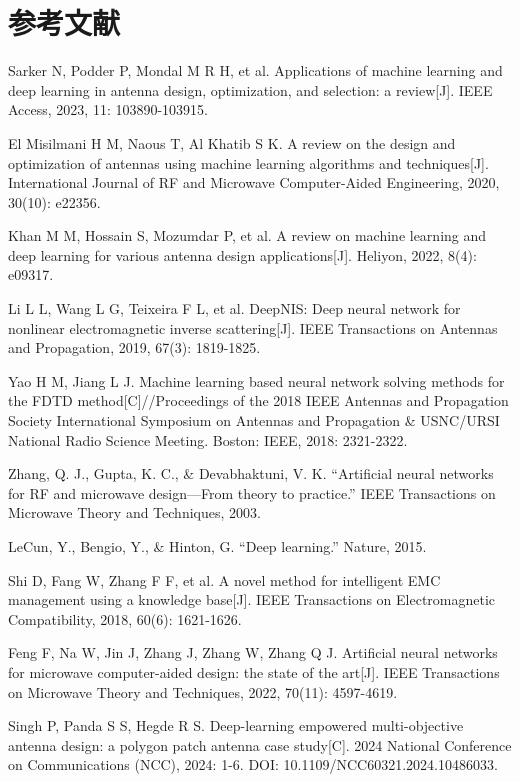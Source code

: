 \documentclass[UTF8,a4paper,12pt]{ctexart}
\begin{document}
\section*{参考文献}
\begin{enumerate}[label={\textnormal{[\arabic*]}},leftmargin=2.8em,itemsep=0.35em]
\item Sarker N, Podder P, Mondal M R H, et al. Applications of machine learning and deep learning in antenna design, optimization, and selection: a review[J]. IEEE Access, 2023, 11: 103890-103915.
\item El Misilmani H M, Naous T, Al Khatib S K. A review on the design and optimization of antennas using machine learning algorithms and techniques[J]. International Journal of RF and Microwave Computer-Aided Engineering, 2020, 30(10): e22356.
\item Khan M M, Hossain S, Mozumdar P, et al. A review on machine learning and deep learning for various antenna design applications[J]. Heliyon, 2022, 8(4): e09317.
\item Li L L, Wang L G, Teixeira F L, et al. DeepNIS: Deep neural network for nonlinear electromagnetic inverse scattering[J]. IEEE Transactions on Antennas and Propagation, 2019, 67(3): 1819-1825.
\item Yao H M, Jiang L J. Machine learning based neural network solving methods for the FDTD method[C]//Proceedings of the 2018 IEEE Antennas and Propagation Society International Symposium on Antennas and Propagation \& USNC/URSI National Radio Science Meeting. Boston: IEEE, 2018: 2321-2322.
\item Zhang, Q. J., Gupta, K. C., \& Devabhaktuni, V. K. “Artificial neural networks for RF and microwave design—From theory to practice.” IEEE Transactions on Microwave Theory and Techniques, 2003.
\item LeCun, Y., Bengio, Y., \& Hinton, G. “Deep learning.” Nature, 2015.
\item Shi D, Fang W, Zhang F F, et al. A novel method for intelligent EMC management using a knowledge base[J]. IEEE Transactions on Electromagnetic Compatibility, 2018, 60(6): 1621-1626.
\item Feng F, Na W, Jin J, Zhang J, Zhang W, Zhang Q J. Artificial neural networks for microwave computer-aided design: the state of the art[J]. IEEE Transactions on Microwave Theory and Techniques, 2022, 70(11): 4597-4619.
\item Singh P, Panda S S, Hegde R S. Deep-learning empowered multi-objective antenna design: a polygon patch antenna case study[C]. 2024 National Conference on Communications (NCC), 2024: 1-6. DOI: 10.1109/NCC60321.2024.10486033.

\end{enumerate}
\end{document}
